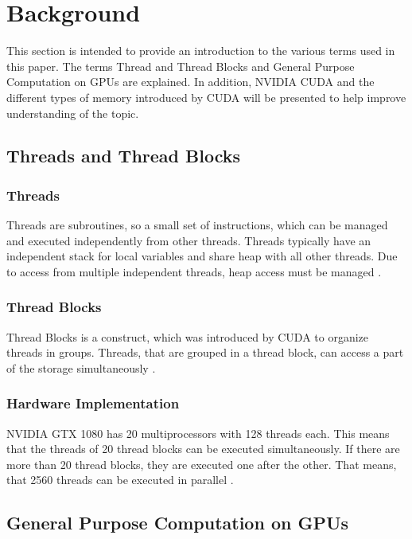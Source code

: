 \documentclass[conference]{IEEEtran}
\begin{document}
\section{Background}

	This section is intended to provide an introduction to the various terms used in this paper. The terms Thread and Thread Blocks and General Purpose Computation on GPUs are explained. In addition, NVIDIA CUDA and the different types of memory introduced by CUDA will be presented to help improve understanding of the topic.

	\subsection{Threads and Thread Blocks}
	
	\subsubsection{Threads}
	Threads are subroutines, so a small set of instructions, which can be managed and executed independently from other threads. Threads typically have an independent stack for local variables and share heap with all other threads. Due to access from multiple independent threads, heap access must be managed  \cite{threadDefinition}.
	
	
	\subsubsection{Thread Blocks}
	Thread Blocks is a construct, which was introduced by CUDA to organize threads in groups. Threads, that are grouped in a thread block, can access a part of the storage simultaneously \cite{cudap}.
	
	\subsubsection{Hardware Implementation}
	NVIDIA GTX 1080 has 20 multiprocessors with 128 threads each. This means that the threads of 20 thread blocks can be executed simultaneously. If there are more than 20 thread blocks, they are executed one after the other.
	That means, that 2560 threads can be executed in parallel \cite{1080gtxdepth}.
	
	
	
	\subsection{General Purpose Computation on GPUs}
		
\end{document}
